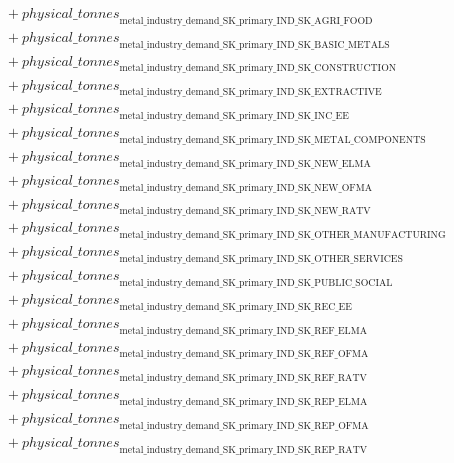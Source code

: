 \documentclass[11pt]{article}
\begin{document}
\begin{align*}
&\quad {}+ {physical\_tonnes}_{\text{metal\_industry\_demand\_SK\_primary\_IND\_SK\_AGRI\_FOOD}}\\
&\quad {}+ {physical\_tonnes}_{\text{metal\_industry\_demand\_SK\_primary\_IND\_SK\_BASIC\_METALS}}\\
&\quad {}+ {physical\_tonnes}_{\text{metal\_industry\_demand\_SK\_primary\_IND\_SK\_CONSTRUCTION}}\\
&\quad {}+ {physical\_tonnes}_{\text{metal\_industry\_demand\_SK\_primary\_IND\_SK\_EXTRACTIVE}}\\
&\quad {}+ {physical\_tonnes}_{\text{metal\_industry\_demand\_SK\_primary\_IND\_SK\_INC\_EE}}\\
&\quad {}+ {physical\_tonnes}_{\text{metal\_industry\_demand\_SK\_primary\_IND\_SK\_METAL\_COMPONENTS}}\\
&\quad {}+ {physical\_tonnes}_{\text{metal\_industry\_demand\_SK\_primary\_IND\_SK\_NEW\_ELMA}}\\
&\quad {}+ {physical\_tonnes}_{\text{metal\_industry\_demand\_SK\_primary\_IND\_SK\_NEW\_OFMA}}\\
&\quad {}+ {physical\_tonnes}_{\text{metal\_industry\_demand\_SK\_primary\_IND\_SK\_NEW\_RATV}}\\
&\quad {}+ {physical\_tonnes}_{\text{metal\_industry\_demand\_SK\_primary\_IND\_SK\_OTHER\_MANUFACTURING}}\\
&\quad {}+ {physical\_tonnes}_{\text{metal\_industry\_demand\_SK\_primary\_IND\_SK\_OTHER\_SERVICES}}\\
&\quad {}+ {physical\_tonnes}_{\text{metal\_industry\_demand\_SK\_primary\_IND\_SK\_PUBLIC\_SOCIAL}}\\
&\quad {}+ {physical\_tonnes}_{\text{metal\_industry\_demand\_SK\_primary\_IND\_SK\_REC\_EE}}\\
&\quad {}+ {physical\_tonnes}_{\text{metal\_industry\_demand\_SK\_primary\_IND\_SK\_REF\_ELMA}}\\
&\quad {}+ {physical\_tonnes}_{\text{metal\_industry\_demand\_SK\_primary\_IND\_SK\_REF\_OFMA}}\\
&\quad {}+ {physical\_tonnes}_{\text{metal\_industry\_demand\_SK\_primary\_IND\_SK\_REF\_RATV}}\\
&\quad {}+ {physical\_tonnes}_{\text{metal\_industry\_demand\_SK\_primary\_IND\_SK\_REP\_ELMA}}\\
&\quad {}+ {physical\_tonnes}_{\text{metal\_industry\_demand\_SK\_primary\_IND\_SK\_REP\_OFMA}}\\
&\quad {}+ {physical\_tonnes}_{\text{metal\_industry\_demand\_SK\_primary\_IND\_SK\_REP\_RATV}}\\

\end{align*}
\end{document}

